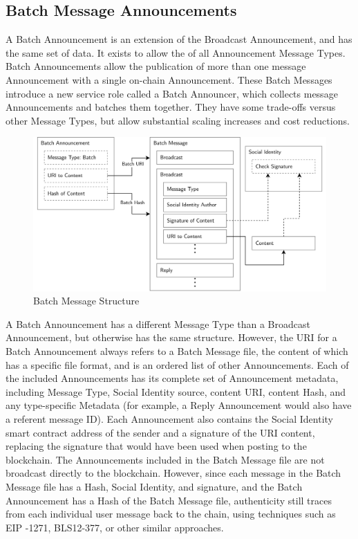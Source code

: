 \documentclass[12pt,letterpaper]{article}
\begin{document}
\begin{appendices}


	\section{Batch Message Announcements}\label{app:batch_message_announcements}

	A Batch Announcement is an extension of the Broadcast Announcement, and
	has the same set of data. It exists to allow the  of all
	Announcement Message Types. Batch Announcements allow the publication of
	more than one message Announcement with a single on-chain Announcement.
	These Batch Messages introduce a new service role called a Batch
	Announcer, which collects message Announcements and batches them
	together. They have some trade-offs versus other Message Types, but
	allow substantial scaling increases and cost reductions.

	\begin{figure}[h]
		\includegraphics[width=\linewidth]{figures/Batch Message Structure.png}
		\caption{Batch Message Structure}
		\label{fig:9}
	\end{figure}

	A Batch Announcement has a different Message Type than a Broadcast
	Announcement, but otherwise has the same structure. However, the URI for
	a Batch Announcement always refers to a Batch Message file, the content
	of which has a specific file format, and is an ordered list of other
	Announcements. Each of the included Announcements has its complete set
	of Announcement metadata, including Message Type, Social Identity
	source, content URI, content Hash, and any type-specific Metadata (for
	example, a Reply Announcement would also have a referent message ID).
	Each Announcement also contains the Social Identity smart contract
	address of the sender and a signature of the URI content, replacing the
	signature that would have been used when posting to the blockchain. The
	Announcements included in the Batch Message file are not broadcast
	directly to the blockchain. However, since each message in the Batch
	Message file has a Hash, Social Identity, and signature, and the Batch
	Announcement has a Hash of the Batch Message file, authenticity still
	traces from each individual user message back to the chain, using
	techniques such as EIP
	-1271,\cite{eip1271} BLS12-377,\cite{el2020} or
	other similar approaches.


\end{appendices}
\end{document}
